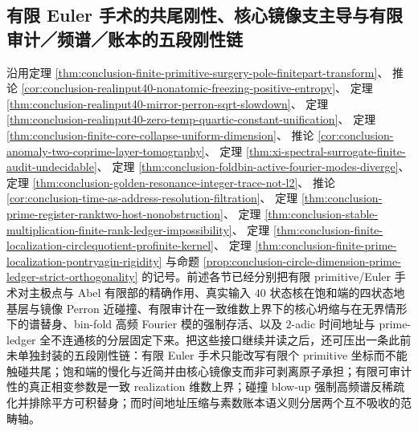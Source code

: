\subsection{有限 Euler 手术的共尾刚性、核心镜像支主导与有限审计／频谱／账本的五段刚性链}\label{subsec:conclusion-euler-coremirror-finiteaudit-antidilution-primeledger-orthogonality}

沿用定理 \ref{thm:conclusion-finite-primitive-surgery-pole-finitepart-transform}、
推论 \ref{cor:conclusion-realinput40-nonatomic-freezing-positive-entropy}、
定理 \ref{thm:conclusion-realinput40-mirror-perron-sqrt-slowdown}、
定理 \ref{thm:conclusion-realinput40-zero-temp-quartic-constant-unification}、
定理 \ref{thm:conclusion-finite-core-collapse-uniform-dimension}、
推论 \ref{cor:conclusion-anomaly-two-coprime-layer-tomography}、
定理 \ref{thm:xi-spectral-surrogate-finite-audit-undecidable}、
定理 \ref{thm:conclusion-foldbin-active-fourier-modes-diverge}、
定理 \ref{thm:conclusion-golden-resonance-integer-trace-not-l2}、
推论 \ref{cor:conclusion-time-as-address-resolution-filtration}、
定理 \ref{thm:conclusion-prime-register-ranktwo-host-nonobstruction}、
定理 \ref{thm:conclusion-stable-multiplication-finite-rank-ledger-impossibility}、
定理 \ref{thm:conclusion-finite-localization-circlequotient-profinite-kernel}、
定理 \ref{thm:conclusion-finite-prime-localization-pontryagin-rigidity}
与命题 \ref{prop:conclusion-circle-dimension-prime-ledger-strict-orthogonality} 的记号。前述各节已经分别把有限 primitive/Euler 手术对主极点与 Abel 有限部的精确作用、真实输入 \(40\) 状态核在饱和端的四状态地基层与镜像 Perron 近碰撞、有限审计在一致维数上界下的核心坍缩与在无界情形下的谱替身、bin-fold 高频 Fourier 模的强制存活、以及 \(2\)-adic 时间地址与 prime-ledger 全不连通核的分层固定下来。把这些接口继续并读之后，还可压出一条此前未单独封装的五段刚性链：有限 Euler 手术只能改写有限个 primitive 坐标而不能触碰共尾；饱和端的慢化与近简并由核心镜像支而非可剥离原子承担；有限可审计性的真正相变参数是一致 realization 维数上界；碰撞 blow-up 强制高频谱反稀疏化并排除平方可积替身；而时间地址压缩与素数账本语义则分居两个互不吸收的范畴轴。

